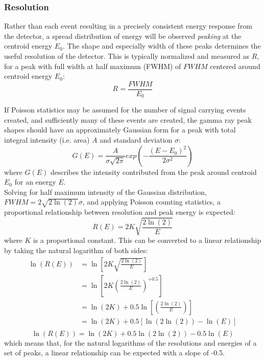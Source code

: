 \documentclass[12pt]{article}
\begin{document}
\subsubsection{Resolution}
Rather than each event resulting in a precisely consistent energy response from the detector, a spread distribution of energy will be observed \emph{peaking} at the centroid energy $E_0$.
The shape and especially width of these peaks determines the useful resolution of the detector.
This is typically normalized and measured as $R$, for a peak with full width at half maximum (FWHM) of $FWHM$ centered around centroid energy $E_0$\cite{npre_lab_6_manual_2025}:\\
\begin{equation}\label{eq:resol}
    R=\frac{FWHM}{E_0}
\end{equation}

If Poisson statistics may be assumed for the number of signal carrying events created, and sufficiently many of these events are created, the gamma ray peak shapes should have an approximately Gaussian form for a peak with total integral intensity (i.e. area) $A$ and standard deviation $\sigma$\cite{npre_lab_6_manual_2025}:
\begin{equation}
    G(E) = \frac{A}{\sigma\sqrt{2\pi}}exp\left(-\frac{(E-E_0)^2}{2\sigma^2}\right)
\end{equation}
where $G(E)$ describes the intensity contributed from the peak around centroid $E_0$ for an energy $E$.\\

Solving for half maximum intensity of the Gaussian distribution, $FWHM=2\sqrt{2\ln(2)}\sigma$, and applying Poisson counting statistics, a proportional relationship between resolution and peak energy is expected\cite{npre_lab_6_manual_2025}:
\begin{equation}
    \label{eq:res-prop}
    R(E) = 2K\sqrt{\frac{2\ln(2)}{E}}
\end{equation}
where $K$ is a proportional constant.
This can be converted to a linear relationship by taking the natural logarithm of both sides:
\begin{align*}
    \ln(R(E)) &= \ln\left[2K\sqrt{\frac{2\ln(2)}{E}}\right]\\
    &= \ln\left[2K\left({\frac{2\ln(2)}{E}}\right)^{+0.5}\right]\\
    &= \ln(2K)+0.5\ln\left[\left({\frac{2\ln(2)}{E}}\right)\right]\\
    &= \ln(2K)+0.5\left[\ln(2\ln(2))-\ln(E)\right]\\
\end{align*}
\begin{equation}\label{eq:res-log}
    \ln(R(E)) = \ln(2K)+0.5\ln(2\ln(2))-0.5\ln(E)
\end{equation}
which means that, for the natural logarithms of the resolutions and energies of a set of peaks, a linear relationship can be expected with a slope of -0.5.\\
\end{document}
